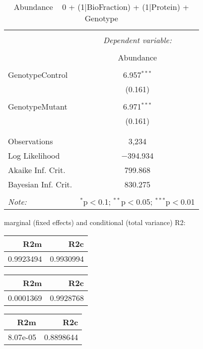 \documentclass[11pt]{report}
\begin{document}
\begin{table}[!htbp] \centering 
  \caption{Abundance ~ 0 + (1|BioFraction) + (1|Protein) + Genotype} 
  \label{} 
\begin{tabular}{@{\extracolsep{5pt}}lc} 
\\[-1.8ex]\hline 
\hline \\[-1.8ex] 
 & \multicolumn{1}{c}{\textit{Dependent variable:}} \\ 
\cline{2-2} 
\\[-1.8ex] & Abundance \\ 
\hline \\[-1.8ex] 
 GenotypeControl & 6.957$^{***}$ \\ 
  & (0.161) \\ 
  & \\ 
 GenotypeMutant & 6.971$^{***}$ \\ 
  & (0.161) \\ 
  & \\ 
\hline \\[-1.8ex] 
Observations & 3,234 \\ 
Log Likelihood & $-$394.934 \\ 
Akaike Inf. Crit. & 799.868 \\ 
Bayesian Inf. Crit. & 830.275 \\ 
\hline 
\hline \\[-1.8ex] 
\textit{Note:}  & \multicolumn{1}{r}{$^{*}$p$<$0.1; $^{**}$p$<$0.05; $^{***}$p$<$0.01} \\ 
\end{tabular} 
\end{table} 
marginal (fixed effects) and conditional (total variance) R2:

\begin{tabular}{r|r}
\hline
R2m & R2c\\
\hline
0.9923494 & 0.9930994\\
\hline
\end{tabular}

\begin{tabular}{r|r}
\hline
R2m & R2c\\
\hline
0.0001369 & 0.9928768\\
\hline
\end{tabular}

\begin{tabular}{r|r}
\hline
R2m & R2c\\
\hline
8.07e-05 & 0.8898644\\
\hline
\end{tabular}
\end{document}
